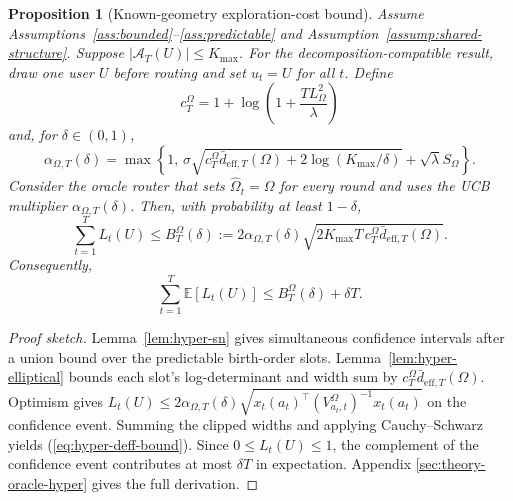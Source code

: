 \documentclass{article} %
\newtheorem{proposition}[theorem]{Proposition}
\renewcommand{\eqref}[1]{\textup{(\ref{#1})}}
\begin{document}
\begin{proposition}[Known-geometry exploration-cost bound]
\label{prop:deff-bound}
Assume Assumptions~\ref{ass:bounded}--\ref{ass:predictable} and
Assumption~\ref{assump:shared-structure}. Suppose
$|\mathcal A_T(U)|\le K_{\max}$. For the decomposition-compatible result,
draw one user \(U\) before routing and set \(u_t=U\) for all \(t\). Define
\begin{equation}
\label{eq:hyper-ct}
c_T^\Omega
=
1+\log\!\left(1+\frac{TL_\Omega^2}{\lambda}\right)
\end{equation}
and, for $\delta\in(0,1)$,
\begin{equation}
\label{eq:hyper-alpha-main}
\alpha_{\Omega,T}(\delta)
=
\max\!\left\{
1,\,
\sigma\sqrt{
c_T^\Omega\bar d_{\mathrm{eff},T}(\Omega)
+2\log(K_{\max}/\delta)}
+\sqrt{\lambda}S_\Omega
\right\}.
\end{equation}
Consider the oracle router that sets $\widehat\Omega_t=\Omega$ for every round
and uses the UCB multiplier $\alpha_{\Omega,T}(\delta)$. Then, with
probability at least $1-\delta$,
\begin{equation}
\label{eq:hyper-deff-bound}
\sum_{t=1}^{T}L_t(U)
\le
B_T^\Omega(\delta)
:=
2\alpha_{\Omega,T}(\delta)
\sqrt{
2K_{\max}T\,c_T^\Omega
\bar d_{\mathrm{eff},T}(\Omega)
}.
\end{equation}
Consequently,
\begin{equation}
\label{eq:hyper-deff-bound-expect-main}
\sum_{t=1}^{T}\mathbb{E}[L_t(U)]
\le
B_T^\Omega(\delta)+\delta T.
\end{equation}
\end{proposition}

\begin{proof}[Proof sketch]
Lemma~\ref{lem:hyper-sn} gives simultaneous confidence intervals after a
union bound over the predictable birth-order slots. Lemma~\ref{lem:hyper-elliptical}
bounds each slot's log-determinant and width sum by
$c_T^\Omega\bar d_{\mathrm{eff},T}(\Omega)$. Optimism gives
$L_t(U)\le2\alpha_{\Omega,T}(\delta)
\sqrt{x_t(a_t)^\top(V_{a_t,t}^{\Omega})^{-1}x_t(a_t)}$ on the confidence
event. Summing the clipped widths and applying Cauchy--Schwarz yields
\eqref{eq:hyper-deff-bound}. Since $0\le L_t(U)\le1$, the complement of the
confidence event contributes at most $\delta T$ in expectation. Appendix
\ref{sec:theory-oracle-hyper} gives the full derivation.
\end{proof}
\end{document}
